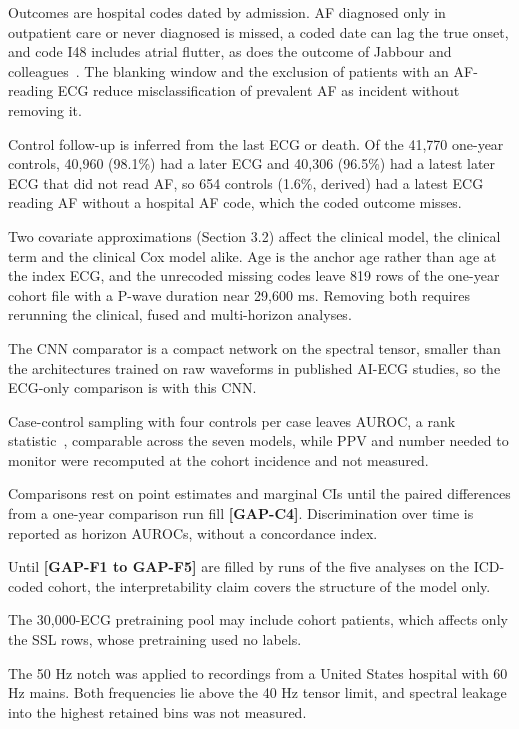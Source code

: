 \documentclass[preprint,12pt]{elsarticle}
\begin{document}
Outcomes are hospital codes dated by admission. AF diagnosed only in outpatient care or never diagnosed is missed, a coded date can lag the true onset, and code I48 includes atrial flutter, as does the outcome of Jabbour and colleagues~\cite{jabbour2024}. The blanking window and the exclusion of patients with an AF-reading ECG reduce misclassification of prevalent AF as incident without removing it.

Control follow-up is inferred from the last ECG or death. Of the 41,770 one-year controls, 40,960 (98.1\%) had a later ECG and 40,306 (96.5\%) had a latest later ECG that did not read AF, so 654 controls (1.6\%, derived) had a latest ECG reading AF without a hospital AF code, which the coded outcome misses.

Two covariate approximations (Section 3.2) affect the clinical model, the clinical term and the clinical Cox model alike. Age is the anchor age rather than age at the index ECG, and the unrecoded missing codes leave 819 rows of the one-year cohort file with a P-wave duration near 29,600 ms. Removing both requires rerunning the clinical, fused and multi-horizon analyses.

The CNN comparator is a compact network on the spectral tensor, smaller than the architectures trained on raw waveforms in published AI-ECG studies, so the ECG-only comparison is with this CNN.

Case-control sampling with four controls per case leaves AUROC, a rank statistic~\cite{hanley1982}, comparable across the seven models, while PPV and number needed to monitor were recomputed at the cohort incidence and not measured.

Comparisons rest on point estimates and marginal CIs until the paired differences from a one-year comparison run fill \textbf{[GAP-C4]}. Discrimination over time is reported as horizon AUROCs, without a concordance index.

Until \textbf{[GAP-F1 to GAP-F5]} are filled by runs of the five analyses on the ICD-coded cohort, the interpretability claim covers the structure of the model only.

The 30,000-ECG pretraining pool may include cohort patients, which affects only the SSL rows, whose pretraining used no labels.

The 50 Hz notch was applied to recordings from a United States hospital with 60 Hz mains. Both frequencies lie above the 40 Hz tensor limit, and spectral leakage into the highest retained bins was not measured.
\end{document}
